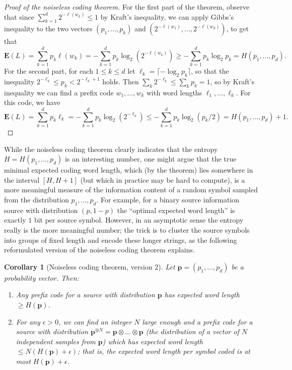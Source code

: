 \documentclass[12pt]{article}
\newtheorem{cor}[thm]{Corollary}
\newcommand{\expec}{\mathbf{E}}
\theoremstyle{example}
\begin{document}
\begin{proof}[Proof of the noiseless coding theorem]
For the first part of the theorem, observe that since $\sum_{k=1}^d 2^{-\ell(w_k)}\le 1$ by Kraft's inequality, we can apply Gibbs's inequality to the two vectors $(p_1,\ldots,p_k)$ and $(2^{-\ell(w_1)}, \ldots, 2^{-\ell(w_d)})$, to get that
$$
\expec(L) = \sum_{k=1}^d p_k \ell(w_k) = -\sum_{k=1}^d p_k \log_2 \left(2^{-\ell(w_k)}\right) \ge -\sum_{k=1}^d p_k \log_2 p_k = H(p_1,\ldots,p_d).
$$
For the second part, for each $1\le k\le d$ let $\ell_k = \lceil -\log_2 p_k\rceil$, so that the inequality
$ 2^{-\ell_k} \le p_k < 2^{-\ell_k+1} $ holds. Then $\sum_k 2^{-\ell_k} \le \sum_k p_k = 1$, so by Kraft's inequality we can find a prefix code $w_1,\ldots,w_k$ with word lengths $\ell_1,\ldots,\ell_k$. For this code, we have
$$
\expec(L) = \sum_{k=1}^d p_k \ell_k = -\sum_{k=1}^d p_k \log_2\left(2^{-\ell_k}\right)
\le -\sum_{k=1}^d p_k \log_2 (p_k/2) = H(p_1,\ldots,p_d) + 1.
$$
\end{proof}

While the noiseless coding theorem clearly indicates that the entropy $H=H(p_1,\ldots,p_d)$ is an interesting number, one might argue that the true minimal expected coding word length, which (by the theorem) lies somewhere in the interval $[H,H+1]$ (but which in practice may be hard to compute), is a more meaningful measure of the information content of a random symbol sampled from the distribution $p_1,\ldots,p_d$. For example, for a binary source information source with distribution $(p,1-p)$ the ``optimal expected word length'' is exactly $1$ bit per source symbol. However, in an asymptotic sense the entropy really is the more meaningful number; the trick is to cluster the source symbols into groups of fixed length and encode these longer strings, as the following reformulated version of the noiseless coding theorem explains.

\begin{cor}[Noiseless coding theorem, version 2]
Let $\mathbf{p}=(p_1,\ldots,p_d)$ be a probability vector. Then:
\begin{enumerate}
\item Any prefix code for a source with distribution $\mathbf{p}$ has expected word length $\ge H(\mathbf{p})$.
\item For any $\epsilon>0$, we can find an integer $N$ large enough and a prefix code for a source with distribution $\mathbf{p}^{\otimes N}=\mathbf{p}\otimes\ldots\otimes\mathbf{p}$ (the distribution of a vector of $N$ independent samples from $\mathbf{p}$) which has expected word length $\le N(H(\mathbf{p})+\epsilon)$; that is, the expected word length \emph{per symbol coded} is at most $H(\mathbf{p})+\epsilon$.
\end{enumerate}
\end{cor}
\end{document}

